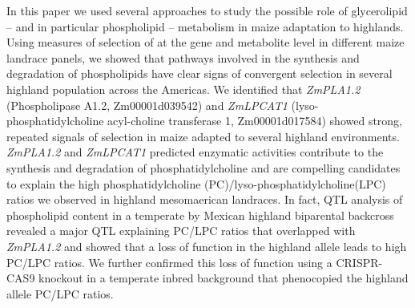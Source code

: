\documentclass[9pt,twocolumn,twoside,lineno]{BioRxiv}
\begin{document}
In this paper we used several approaches to study the possible role of glycerolipid -- and in particular phospholipid -- metabolism in maize adaptation to highlands. %
Using measures of selection of at the gene and metabolite level in different maize landrace panels, we showed that pathways involved in the synthesis and degradation of phospholipids have clear signs of convergent selection in several highland population across the Americas. 
We identified that \textit{ZmPLA1.2} (Phospholipase A1.2, Zm00001d039542) and \textit{ZmLPCAT1} (lyso-phosphatidylcholine acyl-choline transferase 1, Zm00001d017584) showed strong, repeated signals of selection in maize adapted to several highland environments. 
\textit{ZmPLA1.2} and \textit{ZmLPCAT1} predicted enzymatic activities contribute to the synthesis and degradation of phosphatidylcholine and are compelling candidates to explain the high phosphatidylcholine (PC)/lyso-phosphatidylcholine(LPC) ratios we observed in highland mesomaerican landraces. 
In fact, QTL analysis of phospholipid content in a temperate by Mexican highland biparental backcross revealed a major QTL explaining PC/LPC ratios that overlapped with \textit{ZmPLA1.2} and showed that a loss of function in the highland allele leads to high PC/LPC ratios. 
We further confirmed this loss of function using a CRISPR-CAS9 knockout in a temperate inbred background that phenocopied the highland allele PC/LPC ratios. 
\end{document}

